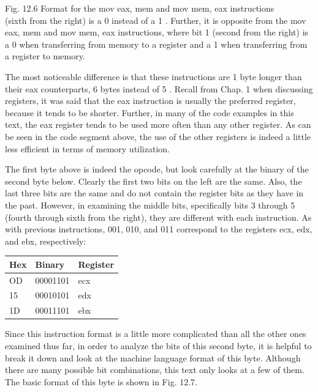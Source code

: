 \documentclass[10pt]{article}
\begin{document}
Fig. 12.6 Format for the mov eax, mem and mov mem, eax instructions\\
(sixth from the right) is a 0 instead of a 1 . Further, it is opposite from the mov eax, mem and mov mem, eax instructions, where bit 1 (second from the right) is a 0 when transferring from memory to a register and a 1 when transferring from a register to memory.

The most noticeable difference is that these instructions are 1 byte longer than their eax counterparts, 6 bytes instead of 5 . Recall from Chap. 1 when discussing registers, it was said that the eax instruction is usually the preferred register, because it tends to be shorter. Further, in many of the code examples in this text, the eax register tends to be used more often than any other register. As can be seen in the code segment above, the use of the other registers is indeed a little less efficient in terms of memory utilization.

The first byte above is indeed the opcode, but look carefully at the binary of the second byte below. Clearly the first two bits on the left are the same. Also, the last three bits are the same and do not contain the register bits as they have in the past. However, in examining the middle bits, specifically bits 3 through 5 (fourth through sixth from the right), they are different with each instruction. As with previous instructions, 001, 010, and 011 correspond to the registers ecx, edx, and ebx, respectively:

\begin{center}
\begin{tabular}{|l|l|l|}
\hline
Hex & Binary & Register \\
\hline
OD & 00001101 & ecx \\
\hline
15 & 00010101 & edx \\
\hline
1D & 00011101 & ebx \\
\hline
\end{tabular}
\end{center}

Since this instruction format is a little more complicated than all the other ones examined thus far, in order to analyze the bits of this second byte, it is helpful to break it down and look at the machine language format of this byte. Although there are many possible bit combinations, this text only looks at a few of them. The basic format of this byte is shown in Fig. 12.7.
\end{document}
